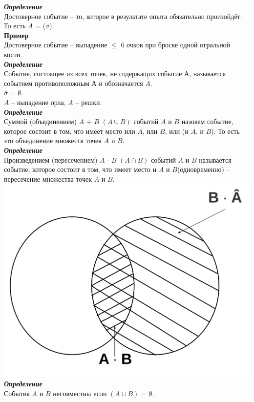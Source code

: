 \documentclass[russian, 12pt, fleqn]{article}
\begin{document}
\textit{\textbf{Определение}} \\Достоверное событие -- то, которое в результате опыта  обязательно произойдёт. То есть $A$ = ($\sigma$).\\
\textbf{Пример}\\Достоверное событие -- выпадение $\leq$ 6 очков при броске одной игральной кости.\\
\textit{\textbf{Определение}}\\ Событие, состоящее из всех точек, не содержащих событие А, называется событием противоположным А и обозначается $\overline{A}$.\\
$\overline{\sigma}$ = $\emptyset$.\\
$A$ -- выпадение орла, $\overline{A}$ -- решки.\\
\textit{\textbf{Определение}}\\ Суммой (объединением)  $A$ + $B$ $(A \cup B)$ событий $A$ и $B$ назовем событие, которое состоит в том, что имеет место или $A$, или $B$, или (и $A$, и $B$). То есть это объединение множеств точек $A$ и $B$.\\
\textit{\textbf{Определение}}\\Произведением (пересечением) $A$ $\cdot$ $B$ $(A \cap B)$ событий $A$ и $B$ называется событие, которое состоит в том, что имеет место и $A$ и $B$(одновременно) -- пересечение множества точек $A$ и $B$.\\
\includegraphics[scale=0.2]{BlankDiagram.png}\\
\textit{\textbf{Определение}} \\События $A$ и $B$ несовместны если $(A \cup B)$ =  $\emptyset$.\\
\end{document}
